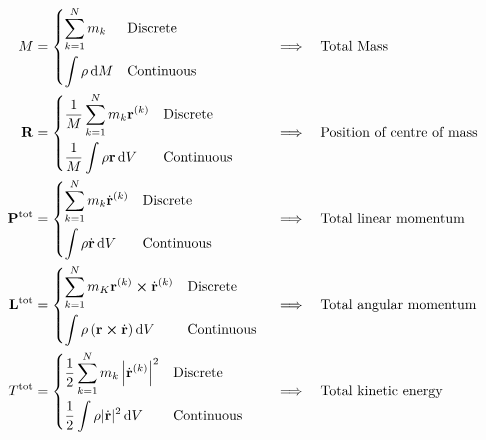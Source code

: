 \documentclass{book}
\begin{document}
\begin{align}
    M & = \begin{dcases}
        \sum_{k=1}^Nm_k & \text{Discrete}\\
        \int\rho \dd{M} & \text{Continuous}
    \end{dcases} &&\implies&& \text{Total Mass}\label{eq:mass}\\
    \vb{R} & = \begin{dcases}
        \frac{1}{M}\sum_{k=1}^Nm_k\vb{r}^{(k)} & \text{Discrete} \\
        \frac{1}{M}\int \rho \vb{r}\dd{V} & \text{Continuous}
    \end{dcases} &&\implies&& \text{Position of centre of mass} \label{eq:com}\\
    \vb{P}^{\text{tot}} & = \begin{dcases}
        \sum_{k=1}^Nm_k \Dot{\vb{r}}^{(k)} & \text{Discrete} \\
        \int \rho\Dot{\vb{r}}\dd{V} & \text{Continuous}
    \end{dcases} &&\implies&& \text{Total linear momentum} \label{eq:linmom}\\
    \vb{L}^{\text{tot}} &= \begin{dcases}
        \sum_{k=1}^Nm_K\vb{r}^{(k)}\cross\Dot{\vb{r}}^{(k)} & \text{Discrete}\\
        \int \rho\left( \vb{r} \cross \Dot{\vb{r}}\right)\dd{V}& \text{Continuous}
    \end{dcases} &&\implies&& \text{Total angular momentum}\label{eq:angmom}\\
    T^{\text{tot}} &= \begin{dcases}
        \frac{1}{2}\sum_{k=1}^Nm_k\left|\Dot{\vb{r}}^{(k)}\right|^2 & \text{Discrete}\\
        \frac{1}{2}\int \rho |\Dot{\vb{r}}|^2\dd{V} & \text{Continuous}
    \end{dcases} &&\implies&& \text{Total kinetic energy} \label{eq:kin}
\end{align}
\end{document}
